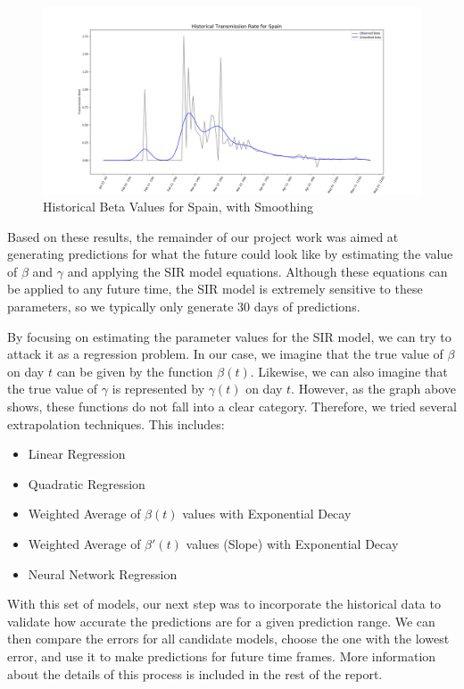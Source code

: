 \documentclass[11pt]{article}
\begin{document}
\begin{figure}[h]
\includegraphics[width=15cm]{images/SampleBetaChart.png}
\centering
\caption{Historical Beta Values for Spain, with Smoothing}
\label{fig:sample-beta}
\end{figure}

Based on these results, the remainder of our project work was aimed at generating predictions for what the future could look like by estimating the value of $\beta$ and $\gamma$ and applying the SIR model equations. Although these equations can be applied to any future time, the SIR model is extremely sensitive to these parameters, so we typically only generate 30 days of predictions.

By focusing on estimating the parameter values for the SIR model, we can try to attack it as a regression problem. In our case, we imagine that the true value of $\beta$ on day $t$ can be given by the function $\beta(t)$. Likewise, we can also imagine that the true value of $\gamma$ is represented by $\gamma(t)$ on day $t$. However, as the graph above shows, these functions do not fall into a clear category. Therefore, we tried several extrapolation techniques. This includes:

\begin{itemize}
    \item Linear Regression
    \item Quadratic Regression
    \item Weighted Average of $\beta(t)$ values with Exponential Decay
    \item Weighted Average of $\beta'(t)$ values (Slope) with Exponential Decay
    \item Neural Network Regression
\end{itemize}

With this set of models, our next step was to incorporate the historical data to validate how accurate the predictions are for a given prediction range. We can then compare the errors for all candidate models, choose the one with the lowest error, and use it to make predictions for future time frames. More information about the details of this process is included in the rest of the report.
\end{document}
